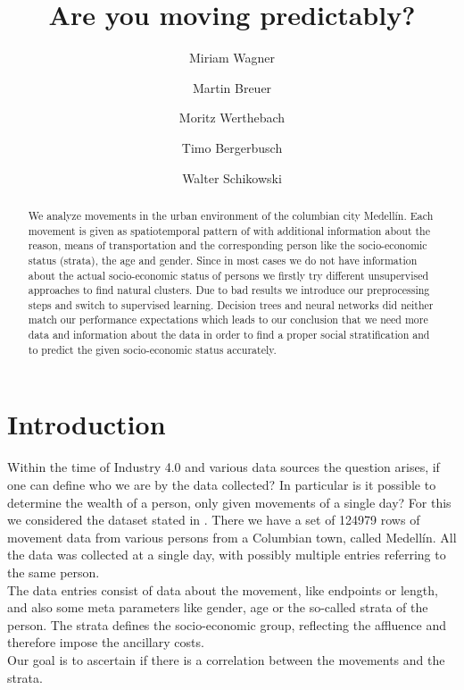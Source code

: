 \documentclass[runningheads]{llncs}
\begin{document}
	
	
	\title{Are you moving predictably?}
	\author{Miriam Wagner\and
		Martin Breuer\and
		Moritz Werthebach\and
		Timo Bergerbusch\and
		Walter Schikowski}
	\maketitle              %
	\begin{abstract} %
		We analyze movements in the urban environment of the columbian city Medellín. Each movement is given as spatiotemporal pattern of with additional information about the reason, means of transportation and the corresponding person like the socio-economic status (strata), the age and gender. Since in most cases we do not have information about the actual socio-economic status of persons we firstly try different unsupervised approaches to find natural clusters. Due to bad results we introduce our preprocessing steps and switch to supervised learning. Decision trees and neural networks did neither match our performance expectations which leads to our conclusion that we need more data and information about the data in order to find a proper social stratification and to predict the given socio-economic status accurately.
		
	\end{abstract}
	\section{Introduction}
	Within the time of Industry 4.0 and various data sources the question arises, if one can define who we are by the data collected? In particular is it possible to determine the wealth of a person, only given movements of a single day?
	For this we considered the dataset stated in \cite{rich_do_not_rise_early}. There we have a set of 124979 rows of movement data from various persons from a Columbian town, called Medellín. All the data was collected at a single day, with possibly multiple entries referring to the same person.\\
	The data entries consist of data about the movement, like endpoints or length, and also some meta parameters like gender, age or the so-called strata of the person. The strata defines the socio-economic group, reflecting the affluence and therefore impose the ancillary costs.\\
	Our goal is to ascertain if there is a correlation between the movements and the strata. 
	
\end{document}
